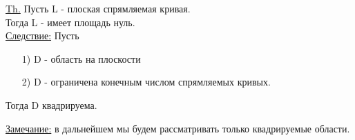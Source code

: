\underline{Th.}
Пусть L - плоская спрямляемая кривая. \\
Тогда L - имеет площадь нуль. \\


\underline{Следствие:}
Пусть \\
\begin{enumerate}
\item[1)] 
D - область на плоскости

\item[2)]
D - ограничена конечным числом спрямляемых кривых.
\end{enumerate}

Тогда D квадрируема.


\underline{Замечание:} в дальнейшем мы будем рассматривать только квадрируемые области.

















